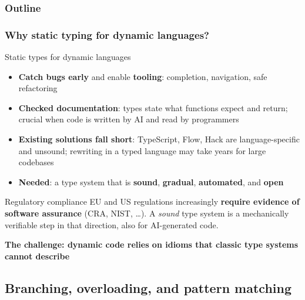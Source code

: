 \begin{frame}
\frametitle{Outline} 
\tableofcontents
\end{frame}

\begin{frame}\transdissolve
\frametitle{Why static typing for dynamic languages?}

\vspace{-3mm}
\small
\begin{block}{Static types for dynamic languages}\setlength{\leftmargini}{1.2em}
  \begin{itemize}\setlength{\itemsep}{1pt}
    \item \textbf{Catch bugs early} and enable \textbf{tooling}: completion,
          navigation, safe refactoring
    \item \textbf{Checked documentation}: types state what functions expect and
          return; crucial when code is written by AI and read by programmers
    \item \textbf{Existing solutions fall short}: TypeScript, Flow, Hack are
          language-specific and unsound; rewriting in a typed language may take years for large codebases
    \item \textbf{Needed}: a type system that is \textbf{sound},
          \textbf{gradual}, \textbf{automated}, and \textbf{open}
  \end{itemize}
\end{block}\pause
{}
\begin{alertblock}{Regulatory compliance}\setlength{\baselineskip}{0.85\baselineskip}
  EU and US regulations increasingly \textbf{require evidence of
  software assurance} (CRA, NIST, \ldots). A
  \emph{sound} type system is a mechanically verifiable step in that direction,
  also for AI-generated code.
\end{alertblock}\vspace{-4mm}\pause
\begin{exampleblock}{\vspace{-3mm}}{\centerline{\bf The challenge: dynamic code relies on idioms that classic
type systems cannot describe}}
\end{exampleblock}
\end{frame}

\subsection{Branching, overloading, and pattern matching}

